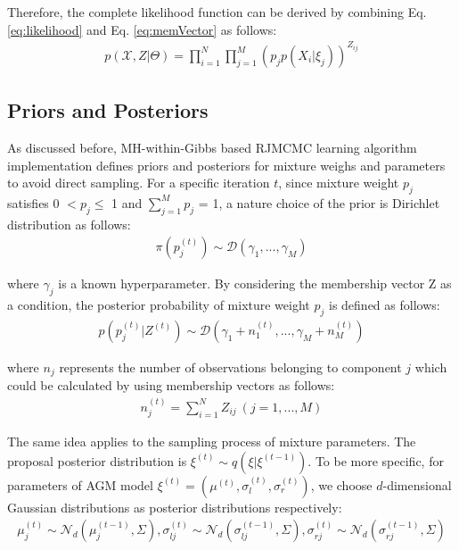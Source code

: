 \documentclass[conference]{IEEEtran}
\begin{document}
Therefore, the complete likelihood function can be derived by combining Eq. \eqref{eq:likelihood} and Eq. \eqref{eq:memVector} as follows:
\begin{align}
p(\mathcal{X}, Z|\Theta) = \prod_{i=1}^{N}\prod_{j=1}^{M}(p_jp(X_i|\xi_j))^{Z_{ij}}
\label{eq:compPdf}
\end{align}

\subsection{Priors and Posteriors}
As discussed before, MH-within-Gibbs based RJMCMC learning algorithm implementation defines priors and posteriors for mixture weighs and parameters to avoid direct sampling. For a specific iteration $t$, since mixture weight $p_j$ satisfies 0 $< p_j \leq$ 1 and $\sum_{j=1}^Mp_j$ = 1, a nature choice of the prior is Dirichlet distribution\cite{Marin2005} as follows:
\begin{align}
\pi(p_j^{(t)}) \sim \mathcal{D}(\gamma_1,...,\gamma_M )
\label{eq:priorWeight}
\end{align}

where $\gamma_j$ is a known hyperparameter. By considering the membership vector Z as a condition, the posterior probability of mixture weight $p_j$ is defined as follows:
\begin{align}
p(p_j^{(t)}|Z^{(t)}) \sim \mathcal{D}(\gamma_1 + n_1^{(t)},...,\gamma_M + n_M^{(t)})
\label{eq:posterWeight}
\end{align}

where $n_j$ represents the number of observations belonging to component $j$ which could be calculated by using membership vectors as follows:
\begin{align}
n_j^{(t)} = \sum_{i=1}^NZ_{ij}\ (j = 1,...,M) 
\label{eq:nj}
\end{align}

The same idea applies to the sampling process of mixture parameters. The proposal posterior distribution is  $\xi^{(t)} \sim q(\xi|\xi^{(t-1)})$. To be more specific, for parameters of AGM model $\xi^{(t)} = (\mu^{(t)}, \sigma_{l}^{(t)}, \sigma_{r}^{(t)})$, we choose $d$-dimensional Gaussian distributions as posterior distributions respectively:
\begin{align}
\mu_j^{(t)} \sim \mathcal{N}_d(\mu_j^{(t-1)},\Sigma),
\sigma_{lj}^{(t)} \sim \mathcal{N}_d(\sigma_{lj}^{(t-1)},\Sigma),
\sigma_{rj}^{(t)} \sim \mathcal{N}_d(\sigma_{rj}^{(t-1)},\Sigma)
\label{eq:posters}
\end{align}
\end{document}
